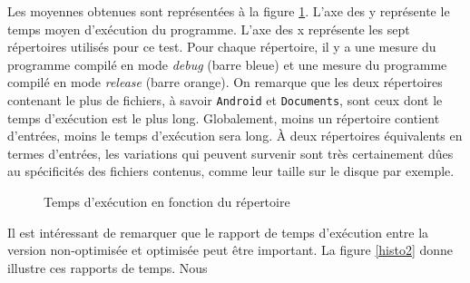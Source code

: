 \bigbreak
Les moyennes obtenues sont représentées à la figure \ref{histo}. L'axe des y représente le temps 
moyen d'exécution du programme. L'axe des x représente les sept répertoires utilisés pour ce test. 
Pour chaque répertoire, il y a une mesure du programme compilé en mode \textit{debug} (barre bleue) 
et une mesure du programme compilé en mode \textit{release} (barre orange). On remarque que les 
deux répertoires contenant le plus de fichiers, à savoir \texttt{Android} et 
\texttt{Documents}, sont ceux dont le temps d'exécution est le plus long. Globalement, 
moins un répertoire contient d'entrées, moins le temps d'exécution sera long. À deux répertoires 
équivalents en termes d'entrées, les variations qui peuvent survenir sont très certainement dûes 
au spécificités des fichiers contenus, comme leur taille sur le disque par exemple.
\begin{figure}
    \begin{center}
    \end{center}
    \caption{Temps d'exécution en fonction du répertoire}
    \label{histo}
\end{figure}
Il est intéressant de remarquer que le rapport de temps d'exécution entre la version non-optimisée 
et optimisée peut être important. La figure \ref{histo2} donne illustre ces rapports de temps. Nous 
